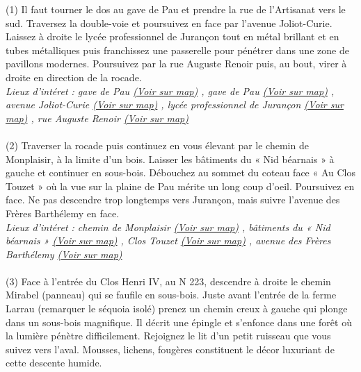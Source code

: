 \documentclass{article}
\begin{document}
        (1)\indent
            Il faut tourner le dos au gave de Pau et prendre la rue de l'Artisanat vers le sud. Traversez la double-voie et poursuivez en face par l'avenue Joliot-Curie. Laissez à droite le lycée professionnel de Jurançon tout en métal brillant et en tubes métalliques puis franchissez une passerelle pour pénétrer dans une zone de pavillons modernes. Poursuivez par la rue Auguste Renoir puis, au bout, virer à droite en direction de la rocade. 
        \\\emph{Lieux d'intéret : gave de Pau 
        \href{https://www.google.com/maps/?q=43.287530, -0.391115}{(Voir sur map)}
        , gave de Pau 
        \href{https://www.google.com/maps/?q=43.287530, -0.391115}{(Voir sur map)}
        , avenue Joliot-Curie 
        \href{https://www.google.com/maps/?q=43.287530, -0.391115}{(Voir sur map)}
        , lycée professionnel de Jurançon 
        \href{https://www.google.com/maps/?q=43.287530, -0.391115}{(Voir sur map)}
        , rue Auguste Renoir 
        \href{https://www.google.com/maps/?q=43.287530, -0.391115}{(Voir sur map)}
        }\\~\\
(2)\indent
            Traverser la rocade puis continuez en vous élevant par le chemin de Monplaisir, à la limite d'un bois. Laisser les bâtiments du « Nid béarnais » à gauche et continuer en sous-bois. Débouchez au sommet du coteau face « Au Clos Touzet » où la vue sur la plaine de Pau mérite un long coup d'oeil. Poursuivez en face. Ne pas descendre trop longtemps vers Jurançon, mais suivre l'avenue des Frères Barthélemy en face.
        \\\emph{Lieux d'intéret : chemin de Monplaisir 
        \href{https://www.google.com/maps/?q=43.287530, -0.391115}{(Voir sur map)}
        , bâtiments du « Nid béarnais » 
        \href{https://www.google.com/maps/?q=43.287530, -0.391115}{(Voir sur map)}
        , Clos Touzet 
        \href{https://www.google.com/maps/?q=43.287530, -0.391115}{(Voir sur map)}
        , avenue des Frères Barthélemy 
        \href{https://www.google.com/maps/?q=43.287530, -0.391115}{(Voir sur map)}
        }\\~\\
(3)\indent
            Face à l'entrée du Clos Henri IV, au N 223, descendre à droite le chemin Mirabel (panneau) qui se faufile en sous-bois. Juste avant l'entrée de la ferme Larrau (remarquer le séquoia isolé) prenez un chemin creux à gauche qui plonge dans un sous-bois magnifique. Il décrit une épingle et s'enfonce dans une forêt où la lumière pénètre difficilement. Rejoignez le lit d'un petit ruisseau que vous suivez vers l'aval. Mousses, lichens, fougères constituent le décor luxuriant de cette descente humide.
\end{document}
